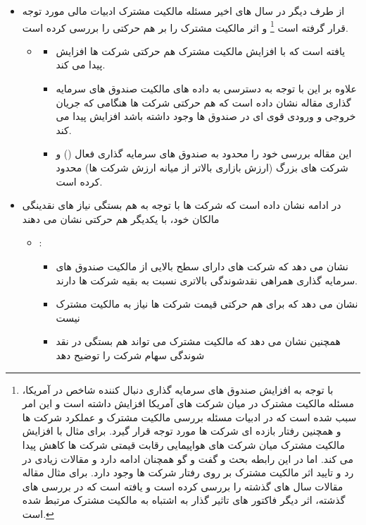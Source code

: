 \documentclass[12pt, a4paper]{article}
\begin{document}
\begin{itemize}
\item 
از طرف دیگر در سال های اخیر مسئله مالکیت مشترک ادبیات مالی مورد توجه قرار گرفته است
\footnote{
	با توجه به افزایش صندوق های سرمایه گذاری  دنبال کننده شاخص در آمریکا، مسئله مالکیت مشترک در میان شرکت های آمریکا افزایش داشته است و این امر سبب شده است که در ادبیات مسئله بررسی مالکیت مشترک و عملکرد شرکت ها و همچنین رفتار بازده ای شرکت ها مورد توجه قرار گیرد. 
	برای مثال 
	با افزایش مالکیت مشترک میان شرکت های هواپیمایی رقابت قیمتی شرکت ها کاهش پیدا می کند.  اما در این رابطه بحث و گفت و گو همچنان ادامه دارد و مقالات زیادی در رد و تایید اثر مالکیت مشترک بر روی رفتار شرکت ها وجود دارد. برای مثال مقاله
	مقالات سال های گذشته را بررسی کرده است و یافته است که در بررسی های گذشته، اثر دیگر فاکتور های تاثیر گذار به اشتباه به مالکیت مشترک مرتبط شده است.
}
 و
اثر مالکیت مشترک را بر هم حرکتی را بررسی کرده است.  

\begin{itemize}
\item {}
\begin{itemize}
\item
یافته است که با افزایش مالکیت مشترک هم حرکتی شرکت ها افزایش پیدا می کند. 
\item
علاوه بر این با توجه به دسترسی به داده های مالکیت صندوق های سرمایه گذاری مقاله نشان داده است که هم حرکتی شرکت ها هنگامی که جریان خروجی و ورودی قوی ای در صندوق ها وجود داشته باشد افزایش پیدا می کند. 
\item
این مقاله بررسی خود را محدود به صندوق های سرمایه گذاری فعال 
() 
و شرکت های بزرگ (ارزش بازاری بالاتر از میانه ارزش شرکت ها) محدود کرده است.
\end{itemize}
\end{itemize}
\item
در ادامه 
نشان داده است که شرکت ها با توجه به هم بستگی نیاز های نقدینگی مالکان خود، با یکدیگر هم حرکتی نشان می دهند
\begin{itemize}
\item {}:
\begin{itemize} 
\item
 نشان می دهد که شرکت های دارای سطح بالایی از مالکیت صندوق های سرمایه گذاری همراهی نقدشوندگی بالاتری نسبت به بقیه شرکت ها دارند.
 \item
 نشان می دهد که برای هم حرکتی قیمت شرکت ها نیاز به مالکیت مشترک نیست
 \item
 همچنین نشان می دهد که مالکیت مشترک می تواند هم بستگی در نقد شوندگی سهام شرکت را توضیح دهد
\end{itemize}
\end{itemize}


\end{itemize}
\end{document}
